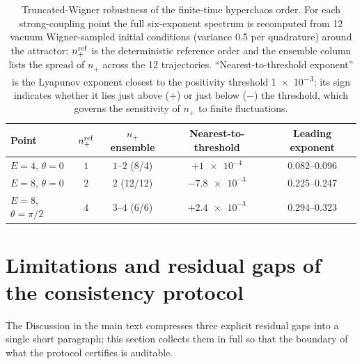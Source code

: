 \documentclass[Phys]{SciPost}
\begin{document}
\begin{table}[h]
  \centering
  \caption{Truncated-Wigner robustness of the finite-time hyperchaos order.
  For each strong-coupling point the full six-exponent spectrum is recomputed
  from \num{12} vacuum Wigner-sampled initial conditions (variance \num{0.5}
  per quadrature) around the attractor; $n_+^{\rm ref}$ is the deterministic
  reference order and the ensemble column lists the spread of $n_+$ across the
  \num{12} trajectories. ``Nearest-to-threshold exponent'' is the Lyapunov
  exponent closest to the positivity threshold \num{1e-3}; its sign indicates
  whether it lies just above ($+$) or just below ($-$) the threshold, which
  governs the sensitivity of $n_+$ to finite fluctuations.}
  \label{SI-tab:si-twa}
  \small
  \setlength{\tabcolsep}{4pt}
  \begin{tabular}{@{}lcccc@{}}
    \toprule
    Point & $n_+^{\rm ref}$ & $n_+$ ensemble & Nearest-to-threshold & Leading exponent \\
    \midrule
    $E=\num{4}$, $\theta=0$ & $1$ & $1$--$2$ (8/4) & $+\num{1e-4}$ & \num{0.082}--\num{0.096} \\
    $E=\num{8}$, $\theta=0$ & $2$ & $2$ (12/12) & $-\num{7.8e-3}$ & \num{0.225}--\num{0.247} \\
    $E=\num{8}$, $\theta=\pi/2$ & $4$ & $3$--$4$ (6/6) & $+\num{2.4e-3}$ & \num{0.294}--\num{0.323} \\
    \bottomrule
  \end{tabular}
\end{table}

\section{Limitations and residual gaps of the consistency protocol}
\label{SI-sec:limitations}

The Discussion in the main text compresses three explicit residual gaps into
a single short paragraph; this section collects them in full so that the
boundary of what the protocol certifies is auditable.
\end{document}
